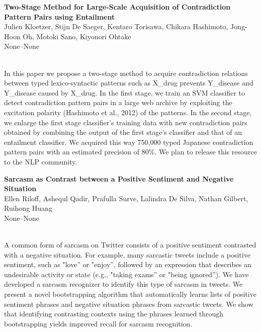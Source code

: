 \documentclass[twoside,makeidx]{book}
\renewcommand{\normalsize}{\fontsize{8}{9}\selectfont}
\renewcommand{\small}{\fontsize{7}{8}\selectfont}
\begin{document}
\par\vspace{2em}\noindent%
\begin{minipage}{\linewidth}%
\begin{center}
\textbf{\normalsize Two-Stage Method for Large-Scale Acquisition of Contradiction Pattern Pairs using Entailment}\\
\normalsize  Julien Kloetzer,  Stijn De Saeger,  Kentaro Torisawa,  Chikara Hashimoto,  Jong-Hoon Oh,  Motoki Sano,  Kiyonori Ohtake\\
{\small None--None}\\
\end{center}
\end{minipage}\\[0.5em]
\nopagebreak%
\noindent%
{\small In this paper we propose a two-stage method to acquire contradiction relations between typed lexico-syntactic patterns such as X\_drug prevents Y\_disease and Y\_disease caused by X\_drug. In the first stage, we train an SVM classifier to detect contradiction pattern pairs in a large web archive by exploiting the excitation polarity (Hashimoto et al., 2012) of the patterns. In the second stage, we enlarge the first stage classifier's training data with new contradiction pairs obtained by combining the output of the first stage's classifier and that of an entailment classifier. We acquired this way 750,000 typed Japanese contradiction pattern pairs with an estimated precision of 80\%. We plan to release this resource to the NLP community.}
\par\vspace{2em}\noindent%
\begin{minipage}{\linewidth}%
\begin{center}
\textbf{\normalsize Sarcasm as Contrast between a Positive Sentiment and Negative Situation}\\
\normalsize  Ellen Riloff,  Ashequl Qadir,  Prafulla Surve,  Lalindra De Silva,  Nathan Gilbert,  Ruihong Huang\\
{\small None--None}\\
\end{center}
\end{minipage}\\[0.5em]
\nopagebreak%
\noindent%
{\small A common form of sarcasm on Twitter consists of a positive sentiment contrasted with a negative situation. For example, many sarcastic tweets include a positive sentiment, such as "love'' or "enjoy'', followed by an expression that describes an undesirable activity or state (e.g., "taking exams'' or "being ignored'').  We have developed a sarcasm recognizer to identify this type of sarcasm in tweets. We present a novel bootstrapping algorithm that automatically learns lists of positive sentiment phrases and negative situation phrases from sarcastic tweets. We show that identifying contrasting contexts using the phrases learned through bootstrapping yields improved recall for sarcasm recognition.}
\end{document}
